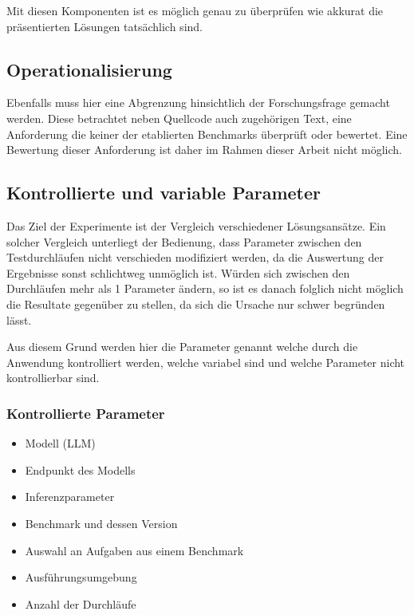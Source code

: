 Mit diesen Komponenten ist es möglich genau zu überprüfen wie akkurat die präsentierten Lösungen tatsächlich sind. 

\subsection{Operationalisierung}


Ebenfalls muss hier eine Abgrenzung hinsichtlich der Forschungsfrage  gemacht werden. Diese betrachtet neben Quellcode auch zugehörigen Text, eine Anforderung die keiner der etablierten Benchmarks überprüft oder bewertet. Eine Bewertung dieser Anforderung ist daher im Rahmen dieser Arbeit nicht möglich.

\subsection{Kontrollierte und variable Parameter}

Das Ziel der Experimente ist der Vergleich verschiedener Lösungsansätze. Ein solcher Vergleich unterliegt der Bedienung, dass Parameter zwischen den Testdurchläufen nicht verschieden modifiziert werden, da die Auswertung der Ergebnisse sonst schlichtweg unmöglich ist. Würden sich zwischen den Durchläufen mehr als 1 Parameter ändern, so ist es danach folglich nicht möglich die Resultate gegenüber zu stellen, da sich die Ursache nur schwer begründen lässt.

Aus diesem Grund werden hier die Parameter genannt welche durch die Anwendung kontrolliert werden, welche variabel sind und welche Parameter nicht kontrollierbar sind.

\subsubsection{Kontrollierte Parameter}

\begin{itemize}
    \item Modell (LLM)
    \item Endpunkt des Modells
    \item Inferenzparameter
    \item Benchmark und dessen Version
    \item Auswahl an Aufgaben aus einem Benchmark
    \item Ausführungsumgebung
    \item Anzahl der Durchläufe
\end{itemize}

